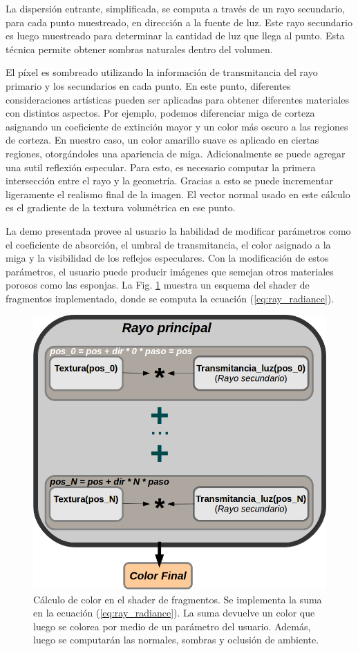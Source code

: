 La dispersión entrante, simplificada, se computa a través de un rayo secundario, para cada punto muestreado, en dirección a la fuente de luz.
Este rayo secundario es luego muestreado para determinar la cantidad de luz que llega al punto.
Esta técnica permite obtener sombras naturales dentro del volumen.

El píxel es sombreado utilizando la información de transmitancia del rayo primario y los secundarios en cada punto.
En este punto, diferentes consideraciones artísticas pueden ser aplicadas para obtener diferentes materiales con distintos aspectos.
Por ejemplo, podemos diferenciar miga de corteza asignando un coeficiente de extinción mayor y un color más oscuro a las regiones de corteza.
En nuestro caso, un color amarillo suave es aplicado en ciertas regiones, otorgándoles una apariencia de miga.
Adicionalmente se puede agregar una sutil reflexión especular.
Para esto, es necesario computar la primera intersección entre el rayo y la geometría.
Gracias a esto se puede incrementar ligeramente el realismo final de la imagen.
El vector normal usado en este cálculo es el gradiente de la textura volumétrica en ese punto.

La demo presentada provee al usuario la habilidad de modificar parámetros como el coeficiente de absorción, el umbral de transmitancia, el color asignado a la miga y la visibilidad de los reflejos especulares.
Con la modificación de estos parámetros, el usuario puede producir imágenes que semejan otros materiales porosos como las esponjas.
La Fig. \ref{fg:fragmentshaderrte} muestra un esquema del shader de fragmentos implementado, donde se computa la ecuación (\ref{eq:ray_radiance}).

\begin{figure}[htb!]
\centerline{\includegraphics[width=12cm]{fragmentshader}}
\caption[Cálculo de color en el shader de fragmentos]{Cálculo de color en el shader de fragmentos. Se implementa la suma en la ecuación (\ref{eq:ray_radiance}). La suma devuelve un color que luego se colorea por medio de un parámetro del usuario. Además, luego se computarán las normales, sombras y oclusión de ambiente.}
\label{fg:fragmentshaderrte}
\end{figure}


